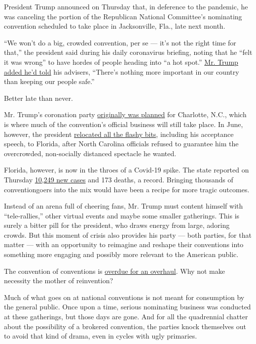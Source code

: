 President Trump announced on Thursday that, in deference to the
pandemic, he was canceling the portion of the Republican National
Committee's nominating convention scheduled to take place in
Jacksonville, Fla., late next month.

``We won't do a big, crowded convention, per se --- it's not the right
time for that,'' the president said during his daily coronavirus
briefing, noting that he ``felt it was wrong'' to have hordes of people
heading into ``a hot spot.''
\href{https://www.nytimes3xbfgragh.onion/2020/07/23/us/politics/jacksonville-rnc.html}{Mr.
Trump added he'd told} his advisers, ``There's nothing more important in
our country than keeping our people safe.''

Better late than never.

Mr. Trump's coronation party
\href{https://www.nytimes3xbfgragh.onion/2020/06/06/us/politics/republican-convention-charlotte-2020.html}{originally
was planned} for Charlotte, N.C., which is where much of the
convention's official business will still take place. In June, however,
the president
\href{https://www.nytimes3xbfgragh.onion/2020/06/11/us/politics/trump-jacksonville-rnc-speech.html}{relocated
all the flashy bits}, including his acceptance speech, to Florida, after
North Carolina officials refused to guarantee him the overcrowded,
non-socially distanced spectacle he wanted.

Florida, however, is now in the throes of a Covid-19 spike. The state
reported on Thursday \href{https://floridahealthcovid19.gov/}{10,249 new
cases} and 173 deaths, a record. Bringing thousands of conventiongoers
into the mix would have been a recipe for more tragic outcomes.

Instead of an arena full of cheering fans, Mr. Trump must content
himself with ``tele-rallies,'' other virtual events and maybe some
smaller gatherings. This is surely a bitter pill for the president, who
draws energy from large, adoring crowds. But this moment of crisis also
provides his party --- both parties, for that matter --- with an
opportunity to reimagine and reshape their conventions into something
more engaging and possibly more relevant to the American public.

The convention of conventions is
\href{https://www.nytimes3xbfgragh.onion/2020/05/04/us/politics/democratic-republican-convention.html}{overdue
for an overhaul}. Why not make necessity the mother of reinvention?

Much of what goes on at national conventions is not meant for
consumption by the general public. Once upon a time, serious nominating
business was conducted at these gatherings, but those days are gone. And
for all the quadrennial chatter about the possibility of a brokered
convention, the parties knock themselves out to avoid that kind of
drama, even in cycles with ugly primaries.

